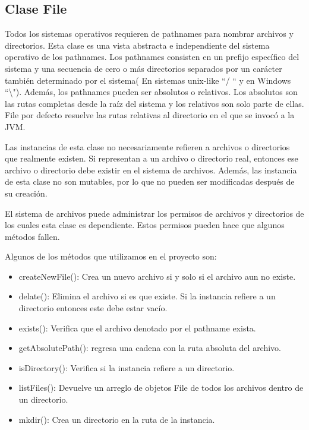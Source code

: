 \documentclass[11pt]{article}
\begin{document}
\subsection{Clase File}
Todos los sistemas operativos requieren de pathnames para nombrar archivos y directorios. Esta clase es una vista abstracta e independiente del sistema operativo de los pathnames. Los pathnames consisten en un prefijo específico del sistema y una secuencia de cero o más directorios separados por un carácter también determinado por el sistema( En sistemas unix-like ``/ `` y en Windows ``\textbackslash"). Además, los pathnames pueden ser absolutos o relativos. Los absolutos son las rutas completas desde la raíz del sistema y los relativos son solo parte de ellas. File por defecto resuelve las rutas relativas al directorio en el que se invocó a la JVM.  
\par
Las instancias de esta clase no necesariamente refieren a archivos o directorios que realmente existen. Si representan a un archivo o directorio real, entonces ese archivo o directorio debe existir en el sistema de archivos. Además, las instancia de esta clase no son mutables, por lo que no pueden ser modificadas después de su creación.
\par 
El sistema de archivos puede administrar los permisos de archivos y directorios de los cuales esta clase es dependiente. Estos permisos pueden hace que algunos métodos fallen. 

Algunos de los métodos que utilizamos en el proyecto son:

\begin{itemize}
\item createNewFile(): Crea un nuevo archivo si y solo si el archivo aun no existe.
\item delate(): Elimina el archivo si es que existe. Si la instancia refiere a un directorio entonces este debe estar vacío.
\item exists(): Verifica que el archivo denotado por el pathname exista.
\item getAbsolutePath(): regresa una cadena con la ruta absoluta del archivo.
\item isDirectory(): Verifica si la instancia refiere a un directorio.
\item listFiles(): Devuelve un arreglo de objetos File de todos los archivos dentro de un directorio.
\item mkdir(): Crea un directorio en la ruta de la instancia.

\end{itemize}
\end{document}
